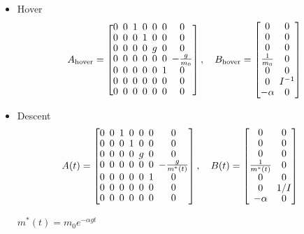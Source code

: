 \documentclass[letterpaper, 10 pt, conference]{ieeeconf}
\begin{document}
\begin{itemize}
    \item Hover
\[
\setlength{\arraycolsep}{2.5pt}
\renewcommand{\arraystretch}{0.9}
A_{\text{hover}} = \begin{bmatrix} 
0 & 0 & 1 & 0 & 0 & 0 & 0 \\ 
0 & 0 & 0 & 1 & 0 & 0 & 0 \\ 
0 & 0 & 0 & 0 & g & 0 & 0 \\ 
0 & 0 & 0 & 0 & 0 & 0 & -\frac{g}{m_0} \\ 
0 & 0 & 0 & 0 & 0 & 1 & 0 \\ 
0 & 0 & 0 & 0 & 0 & 0 & 0 \\ 
0 & 0 & 0 & 0 & 0 & 0 & 0 
\end{bmatrix}, \quad
B_{\text{hover}} = \begin{bmatrix} 
0 & 0 \\ 
0 & 0 \\ 
0 & 0 \\ 
\frac{1}{m_0} & 0 \\ 
0 & 0 \\ 
0 & I^{-1} \\ 
-\alpha & 0 
\end{bmatrix}
\]

\item Descent
\[
\setlength{\arraycolsep}{2.5pt}
\renewcommand{\arraystretch}{0.9}
A(t) = \begin{bmatrix} 
0 & 0 & 1 & 0 & 0 & 0 & 0 \\ 
0 & 0 & 0 & 1 & 0 & 0 & 0 \\ 
0 & 0 & 0 & 0 & g & 0 & 0 \\ 
0 & 0 & 0 & 0 & 0 & 0 & -\frac{g}{m^*(t)} \\ 
0 & 0 & 0 & 0 & 0 & 1 & 0 \\ 
0 & 0 & 0 & 0 & 0 & 0 & 0 \\ 
0 & 0 & 0 & 0 & 0 & 0 & 0 
\end{bmatrix}, \quad
\begin{aligned}
&B(t) = \begin{bmatrix} 
0 & 0 \\ 
0 & 0 \\ 
0 & 0 \\ 
\frac{1}{m^*(t)} & 0 \\ 
0 & 0 \\ 
0 & 1/I \\ 
-\alpha & 0 
\end{bmatrix}
\end{aligned}
\]

$m^*(t) = m_0 e^{-\alpha g t} $
\end{itemize}
\end{document}
